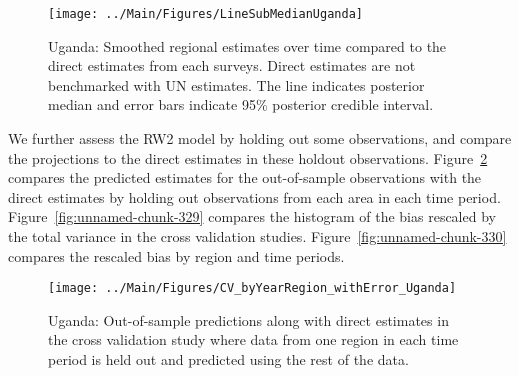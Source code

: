 \documentclass[12pt]{article}\usepackage[]{graphicx}\usepackage[]{color}
\newenvironment{knitrout}{}{} %
\begin{document}
\begin{knitrout}
\color{fgcolor}\begin{figure}[bht]

{\centering \texttt{[image: ../Main/Figures/LineSubMedianUganda]} 

}

\caption[Uganda]{Uganda: Smoothed regional estimates over time compared to the direct estimates from each surveys. Direct estimates are not benchmarked with UN estimates. The line indicates posterior median and error bars indicate 95\% posterior credible interval.}\label{fig:unnamed-chunk-327}
\end{figure}


\end{knitrout}
We further assess the RW2 model by holding out some observations, and compare the projections to the direct estimates in these holdout observations. Figure~\ref{fig:unnamed-chunk-328} compares the predicted estimates for the out-of-sample observations  with the direct estimates by holding out observations from each area in each time period.  Figure~\ref{fig:unnamed-chunk-329} compares the histogram of the bias rescaled by the total variance in the cross validation studies. Figure~\ref{fig:unnamed-chunk-330} compares the rescaled bias by region and time periods.



 
\begin{knitrout}
\color{fgcolor}\begin{figure}[bht]

{\centering \texttt{[image: ../Main/Figures/CV\_byYearRegion\_withError\_Uganda]} 

}

\caption[Uganda]{Uganda: Out-of-sample predictions along with direct estimates in the cross validation study where data from one region in each time period is held out and predicted using the rest of the data.}\label{fig:unnamed-chunk-328}
\end{figure}


\end{knitrout}
\end{document}
